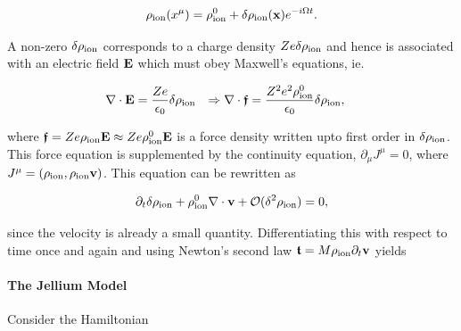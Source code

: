 \begin{equation}
    \rho_{\textnormal{ion}}(x^\mu) = \rho^0_{\textnormal{ion}} + \delta \rho_{\textnormal{ion}} ({\bf x}) e^{-i\Omega t}.
\end{equation}

A non-zero $\delta \rho_{\textnormal{ion}}$ corresponds to a charge density $Z e \delta \rho_{\textnormal{ion}}$ and hence is associated with an electric field ${\bf E}$ which must obey Maxwell's equations, ie.

\begin{align}
    \nabla \cdot {\bf E} &= \frac{Ze}{\epsilon_0} \delta \rho_{\textnormal{ion}} & \Rightarrow  \nabla \cdot \bm{\mathfrak{f}} &= \frac{Z^2 e^2 \rho^0_{\textnormal{ion}} }{\epsilon_0} \delta \rho_{\textnormal{ion}},
\end{align}

where $\bm{\mathfrak{f}} = Z e \rho_{\textnormal{ion}} {\bf E} \approx Z e \rho^0_{\textnormal{ion}} {\bf E}$ is a force density written upto first order in $\delta \rho_{\textnormal{ion}}$. This force equation is supplemented by the continuity equation, $\partial_{\mu} J^\mu = 0$, where $J^\mu = (\rho_{\textnormal{ion}}, \rho_{\textnormal{ion}} {\bf v})$. This equation can be rewritten as 

$$
\partial_t \delta \rho_{\textnormal{ion}} +  \rho^0_{\textnormal{ion}} \nabla \cdot {\bf v} + \mathcal{O}(\delta^2 \rho_{\textnormal{ion}}) = 0,
$$

since the velocity is already a small quantity. Differentiating this with respect to time once and again and using Newton's second law $\bm{\mathfrak{t}} = M \rho_{\textnormal{ion}} \partial_t {\bf v}$ yields 
\fi

\paragraph{\textbf{The Jellium Model}}


Consider the Hamiltonian 

